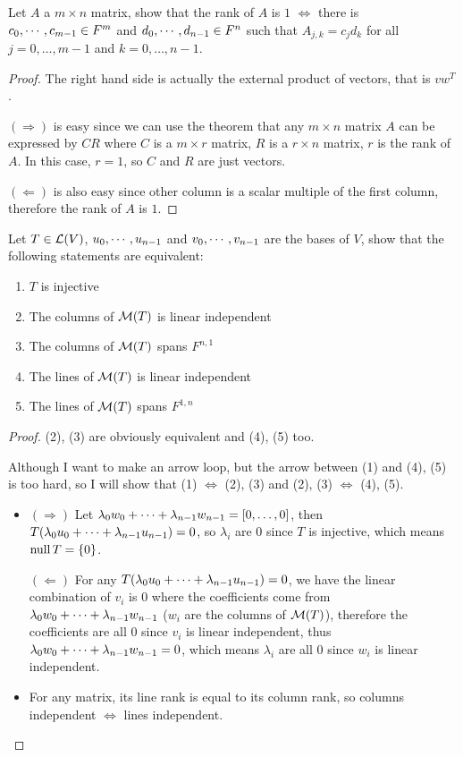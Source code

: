 \documentclass[../main.tex]{subfiles}
\begin{document}
\begin{exercise}
  Let $A$ a $m \times n$ matrix, show that the rank of $A$ is $1$ $\iff$
  there is $\join{c}{m - 1} \in F^m$ and $\join{d}{n - 1} \in F^n$
  such that $A_{j, k} = c_jd_k$ for all $j = 0, \dots, m - 1$ and $k = 0, \dots, n - 1$.
\end{exercise}
\begin{proof}
  The right hand side is actually the external product of vectors, that is $vw^T$.

  $(\Rightarrow)$ is easy since we can use the theorem that any $m \times n$ matrix $A$ can be expressed
  by $CR$ where $C$ is a $m \times r$ matrix, $R$ is a $r \times n$ matrix, $r$ is the rank of $A$.
  In this case, $r = 1$, so $C$ and $R$ are just vectors.

  $(\Leftarrow)$ is also easy since other column is a scalar multiple of the first column,
  therefore the rank of $A$ is $1$.
\end{proof}

\begin{exercise}
  Let $T \in \LT(V)$, $\join{u}{n - 1}$ and $\join{v}{n - 1}$ are the bases of $V$,
  show that the following statements are equivalent:
  \begin{enumerate}
    \item $T$ is injective
    \item The columns of $\M(T)$ is linear independent
    \item The columns of $\M(T)$ spans $F^{n, 1}$
    \item The lines of $\M(T)$ is linear independent
    \item The lines of $\M(T)$ spans $F^{1, n}$
  \end{enumerate}
\end{exercise}
\begin{proof}
  (2), (3) are obviously equivalent and (4), (5) too.

  Although I want to make an arrow loop, but the arrow between (1) and (4), (5) is
  too hard, so I will show that (1) $\iff$ (2), (3) and (2), (3) $\iff$ (4), (5).

  \begin{itemize}
    \item $(\Rightarrow)$ Let $\joinp[+]{\lambda}{w}{n - 1} = [ 0, \dots, 0 ]$,
          then $T(\joinp[+]{\lambda}{u}{n - 1}) = 0$, so $\lambda_i$
          are $0$ since $T$ is injective, which means $\nullv T = \0$.

          $(\Leftarrow)$ For any $T(\joinp[+]{\lambda}{u}{n - 1}) = 0$,
          we have the linear combination of $v_i$ is $0$
          where the coefficients come from $\joinp[+]{\lambda}{w}{n - 1}$
          ($w_i$ are the columns of $\M(T)$),
          therefore the coefficients are all $0$ since $v_i$ is linear independent,
          thus $\joinp[+]{\lambda}{w}{n - 1} = 0$,
          which means $\lambda_i$ are all $0$ since $w_i$ is linear independent.
    \item For any matrix, its line rank is equal to its column rank, so
          columns independent $\iff$ lines independent.
  \end{itemize}
\end{proof}
\end{document}
